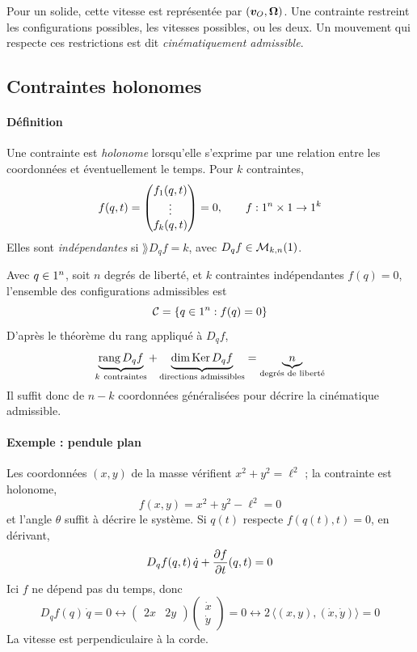 Pour un solide, cette vitesse est représentée par $(\bm{v}_O,
\bm{\Omega})$. Une contrainte restreint les configurations
possibles, les vitesses possibles, ou les deux. Un mouvement qui
respecte ces restrictions est dit \emph{cinématiquement admissible}.

\subsection{Contraintes holonomes}

\paragraph{Définition}

\begin{definition}
    Une contrainte est \emph{holonome} lorsqu'elle s'exprime par une
    relation entre les coordonnées et éventuellement le temps. Pour
    $k$ contraintes,
    \[
        f(q,t) = \begin{pmatrix}
            f_1(q,t)\\ \vdots\\ f_k(q,t)
        \end{pmatrix} = 0,
        \qquad f : 1^n\times1 \to 1^k
    \]
    Elles sont \emph{indépendantes} si $\rang D_q f = k$, avec
    $D_q f\in\mathcal{M}_{k,n}(1)$.
\end{definition}

Avec $q\in1^n$, soit $n$ degrés de liberté, et $k$ contraintes
indépendantes $f(q) = 0$, l'ensemble des configurations admissibles
est
\[
    \mathcal{C} = \{q\in1^n : f(q) = 0\}
\]
D'après le théorème du rang appliqué à $D_q f$,
\[
    \underbrace{\rang D_q f}_{k\ \text{contraintes}}
    + \underbrace{\dim\Ker D_q f}_{\text{directions admissibles}}
    = \underbrace{n}_{\text{degrés de liberté}}
\]
Il suffit donc de $n - k$ coordonnées généralisées pour décrire la
cinématique admissible.

\paragraph{Exemple : pendule plan}

Les coordonnées $(x,y)$ de la masse vérifient $x^2 + y^2 = \ell^2$ ;
la contrainte est holonome,
\[
    f(x,y) = x^2 + y^2 - \ell^2 = 0
\]
et l'angle $\theta$ suffit à décrire le système. Si $q(t)$ respecte
$f(q(t),t) = 0$, en dérivant,
\[
    D_q f(q,t)\,\dot q + \frac{\partial f}{\partial t}(q,t) = 0
\]
Ici $f$ ne dépend pas du temps, donc
\[
    D_q f(q)\,\dot q = 0
    \longleftrightarrow
    \begin{pmatrix} 2x & 2y \end{pmatrix}
    \begin{pmatrix} \dot x\\ \dot y \end{pmatrix} = 0
    \longleftrightarrow
    2\,\langle (x,y),(\dot x,\dot y)\rangle = 0
\]
La vitesse est perpendiculaire à la corde.

